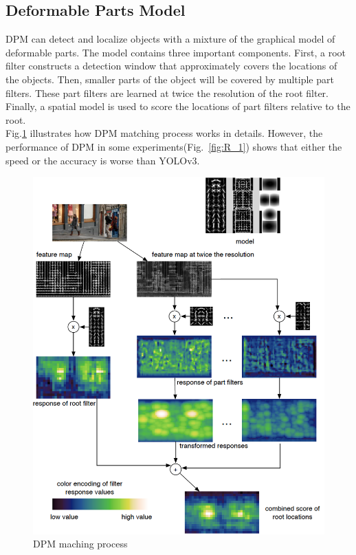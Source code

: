 \documentclass[letterpaper]{article} %
\begin{document}
\subsection{Deformable Parts Model}
\noindent DPM can detect and localize objects with a mixture of the graphical model of deformable parts\cite{DPM}. The model contains three important components. First, a root filter constructs a detection window that approximately covers the locations of the objects. Then, smaller parts of the object will be covered by multiple part filters. These part filters are learned at twice the resolution of the root filter. Finally, a spatial model is used to score the locations of part filters relative to the root.\\

\noindent Fig.\ref{fig:DPM_2} illustrates how DPM matching process works in details. However, the performance of DPM in some experiments(Fig.~\ref{fig:R_1}) shows that either the speed or the accuracy is worse than YOLOv3.\\
\begin{figure}[ht]
\hspace{-18mm}
\centering
\includegraphics[width=0.85\linewidth,height = 1.0\linewidth]{Figure/DPM_2.png}
\caption{\footnotesize{DPM maching process}}
\label{fig:DPM_2}
\vspace{-3mm}
\end{figure}
\end{document}
